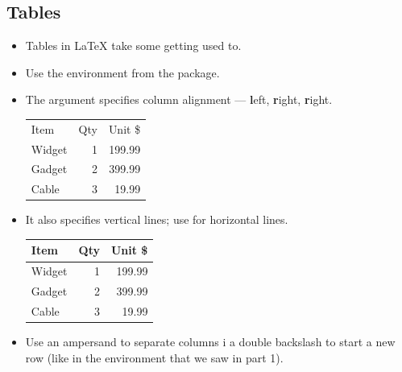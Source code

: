 \documentclass{beamer}
\begin{document}
\subsection{Tables}
\begin{frame}[fragile]{\insertsubsection}
\begin{itemize}
\item Tables in \LaTeX{} take some getting used to.
\item Use the  environment from the  package.
\item The argument specifies column alignment --- \textbf{l}eft, \textbf{r}ight, \textbf{r}ight.
\begin{exampletwouptiny}
\begin{tabular}{lrr}
Item   & Qty & Unit \$ \\
Widget & 1   & 199.99  \\
Gadget & 2   & 399.99  \\
Cable  & 3   & 19.99   \\
\end{tabular}
\end{exampletwouptiny}
\item It also specifies vertical lines; use  for horizontal lines.
\begin{exampletwouptiny}
\begin{tabular}{|l|r|r|} \hline
Item   & Qty & Unit \$ \\\hline
Widget & 1   & 199.99  \\
Gadget & 2   & 399.99  \\
Cable  & 3   & 19.99   \\\hline
\end{tabular}
\end{exampletwouptiny}
\item Use an ampersand \keystrokebftt{\&} to separate columns i a double backslash \keystrokebftt{\bs}\keystrokebftt{\bs} to start a new row (like in the  environment that we saw in part 1).
\end{itemize}
\end{frame}

\end{document}
